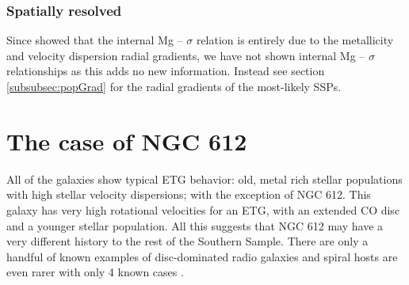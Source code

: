 		\subsubsection{Spatially resolved}
			Since \citet{Mehlert2003} showed that the internal Mg -- $\sigma$ relation is entirely due to the metallicity and velocity dispersion radial gradients, we have not shown internal Mg -- $\sigma$ relationships as this adds no new information. Instead see section \ref{subsubsec:popGrad} for the radial gradients of the most-likely SSPs.

\section{The case of NGC 612}
	\label{sec:NGC612}
	All of the galaxies show typical ETG behavior: old, metal rich stellar populations with high stellar velocity dispersions; with the exception of NGC 612. This galaxy has very high rotational velocities for an ETG, with an extended CO disc and a younger stellar population. All this suggests that NGC 612 may have a very different history to the rest of the Southern Sample. There are only a handful of known examples of disc-dominated radio galaxies \citep[e.g.][]{Morganti2011} and spiral hosts are even rarer with only 4 known cases \citep{Ledlow1998, Hota2011a, Bagchi2014, Mao2015}.

